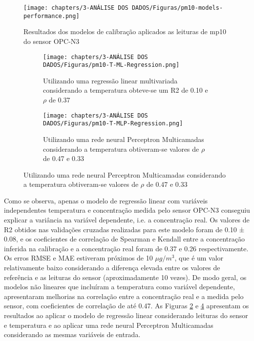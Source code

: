 \begin{figure}[h!]
    \centering
    \caption{Resultados dos modelos de calibração aplicados as leituras de \acrshort{mp10} do sensor OPC-N3}
    \texttt{[image: chapters/3-ANÁLISE DOS DADOS/Figuras/pm10-models-performance.png]}
    \label{fig:data-pm10-models-performance}
\end{figure}

\begin{figure}[h!]
    \centering
    \caption{Gráfico de dispersão das leituras do sensor de \acrshort{mp10} do OPC-N3 e a estação de referência após aplicar modelos de regressão considerando a temperatura}
    \begin{subfigure}{0.49\textwidth}
        \texttt{[image: chapters/3-ANÁLISE DOS DADOS/Figuras/pm10-T-ML-Regression.png]}
        \caption{Utilizando uma regressão linear multivariada considerando a temperatura obteve-se um R2 de 0.10 e $\rho$ de 0.37}
        \label{fig:data-pm10-T-reference-corr-MLR}
    \end{subfigure}
    \hfill
    \begin{subfigure}{0.49\textwidth}
        \texttt{[image: chapters/3-ANÁLISE DOS DADOS/Figuras/pm10-T-MLP-Regression.png]}
        \caption{Utilizando uma rede neural Perceptron Multicamadas considerando a temperatura obtiveram-se valores de $\rho$ de 0.47 e 0.33}
        \label{fig:data-pm10-T-reference-corr-MLP}
    \end{subfigure}
\end{figure}
Como se observa, apenas o modelo de regressão linear com variáveis independentes temperatura e concentração medida pelo sensor OPC-N3 conseguiu explicar a variância na variável dependente, i.e. a concentração real. Os valores de R2 obtidos nas validações cruzadas realizadas para este modelo foram de 0.10 ± 0.08, e os coeficientes de correlação de Spearman e Kendall entre a concentração inferida na calibração e a concentração real foram de 0.37 e 0.26 respectivamente. Os erros RMSE e MAE estiveram próximos de 10 \(\mu g/m^3\), que é um valor relativamente baixo considerando a diferença elevada entre os valores de referência e as leituras do sensor (aproximadamente 10 vezes). De modo geral, os modelos não lineares que incluíram a temperatura como variável dependente, apresentaram melhorias na correlação entre a concentração real e a medida pelo sensor, com coeficientes de correlação de até 0.47. As Figuras \ref{fig:data-pm10-T-reference-corr-MLR} e \ref{fig:data-pm10-T-reference-corr-MLP} apresentam os resultados ao aplicar o modelo de regressão linear considerando leituras do sensor e temperatura e ao aplicar uma rede neural Perceptron Multicamadas considerando as mesmas variáveis de entrada.